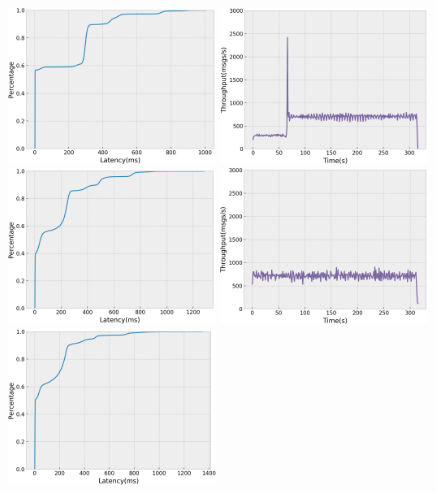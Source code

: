 \begin{figure}[H]
  \centering
  \includegraphics[width=0.49\textwidth,height=\textheight,keepaspectratio]{img/global50_lat.png}
  \includegraphics[width=0.49\textwidth,height=\textheight,keepaspectratio]{img/global50_tp.png}
  \includegraphics[width=0.49\textwidth,height=\textheight,keepaspectratio]{img/global10_lat.png}
  \includegraphics[width=0.49\textwidth,height=\textheight,keepaspectratio]{img/global10_tp.png}
  \includegraphics[width=0.49\textwidth,height=\textheight,keepaspectratio]{img/global5_lat.png}

\end{figure}
